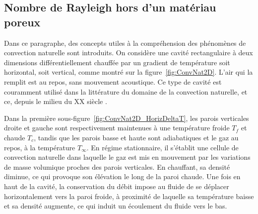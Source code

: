 \subsection{Nombre de Rayleigh hors d'un matériau poreux}\label{chap:Rayleigh_NonPoreux}

Dans ce paragraphe, des concepts utiles à la compréhension des phénomènes de convection naturelle sont introduits. On considère une cavité rectangulaire à deux dimensions différentiellement chauffée par un gradient de température soit horizontal, soit vertical, comme montré sur la figure~\ref{fig:ConvNat2D}. L'air qui la remplit est au repos, sans mouvement acoustique. Ce type de cavité est couramment utilisé dans la littérature du domaine de la convection naturelle, et ce, depuis le milieu du XX\ieme{} siècle \cite{batchelor_heat_1954, menard_convection_2005, chorin_modification_2018}.\medskip

Dans la première sous-figure~\ref{fig:ConvNat2D_HorizDeltaT}, les parois verticales droite et gauche sont respectivement maintenues à une température froide $T_f$ et chaude $T_c$, tandis que les parois basse et haute sont adiabatiques et le gaz au repos, à la température $T_\infty$. En régime stationnaire, il s'établit une cellule de convection naturelle dans laquelle le gaz est mis en mouvement par les  variations de masse volumique proches des parois verticales. En chauffant, sa densité diminue, ce qui provoque son élévation le long de la paroi chaude. Une fois en haut de la cavité, la conservation du débit impose au fluide de se déplacer horizontalement vers la paroi froide, à proximité de laquelle sa température baisse et sa densité augmente, ce qui induit un écoulement du fluide vers le bas.\smallskip%

